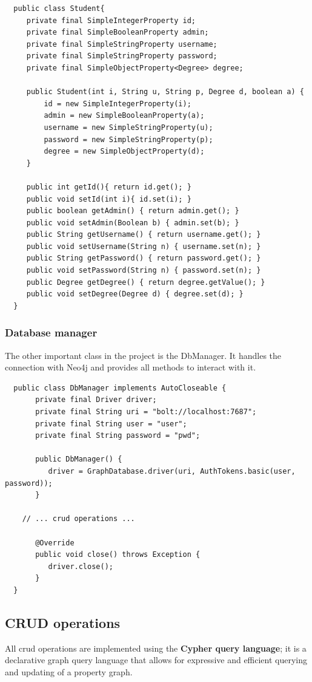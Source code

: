 \documentclass[a4paper]{article}
\begin{document}
\begin{verbatim}
  public class Student{
     private final SimpleIntegerProperty id;
     private final SimpleBooleanProperty admin;
     private final SimpleStringProperty username;
     private final SimpleStringProperty password;
     private final SimpleObjectProperty<Degree> degree;
    
     public Student(int i, String u, String p, Degree d, boolean a) {
         id = new SimpleIntegerProperty(i);
         admin = new SimpleBooleanProperty(a);
         username = new SimpleStringProperty(u);
         password = new SimpleStringProperty(p);
         degree = new SimpleObjectProperty(d);		
     }
    
     public int getId(){ return id.get(); }
     public void setId(int i){ id.set(i); }
     public boolean getAdmin() { return admin.get(); }
     public void setAdmin(Boolean b) { admin.set(b); }
     public String getUsername() { return username.get(); }
     public void setUsername(String n) { username.set(n); }
     public String getPassword() { return password.get(); }
     public void setPassword(String n) { password.set(n); }
     public Degree getDegree() { return degree.getValue(); }
     public void setDegree(Degree d) { degree.set(d); }
  }
\end{verbatim}

\subsubsection{Database manager}
The other important class in the project is the DbManager. It handles the connection with Neo4j and provides all methods to interact with it.

\begin{verbatim}
  public class DbManager implements AutoCloseable {
       private final Driver driver;
       private final String uri = "bolt://localhost:7687";
       private final String user = "user";
       private final String password = "pwd";

       public DbManager() {
          driver = GraphDatabase.driver(uri, AuthTokens.basic(user, password));
       }

    // ... crud operations ...

       @Override
       public void close() throws Exception {
          driver.close();
       }
  }
\end{verbatim}


\subsection{CRUD operations}
All crud operations are implemented using the \textbf{Cypher query language}; it is a declarative graph query language that allows for expressive and efficient querying and updating of a property graph.
\end{document}
